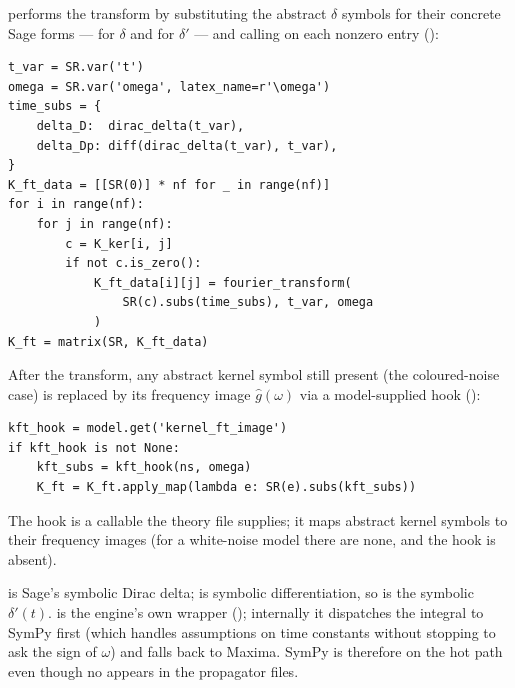  performs the transform by substituting the abstract
$\delta$ symbols for their concrete Sage forms ---  for
$\delta$ and  for $\delta'$ --- and calling
 on each nonzero entry
():

\begin{lstlisting}
t_var = SR.var('t')
omega = SR.var('omega', latex_name=r'\omega')
time_subs = {
    delta_D:  dirac_delta(t_var),
    delta_Dp: diff(dirac_delta(t_var), t_var),
}
K_ft_data = [[SR(0)] * nf for _ in range(nf)]
for i in range(nf):
    for j in range(nf):
        c = K_ker[i, j]
        if not c.is_zero():
            K_ft_data[i][j] = fourier_transform(
                SR(c).subs(time_subs), t_var, omega
            )
K_ft = matrix(SR, K_ft_data)
\end{lstlisting}

After the transform, any abstract kernel symbol still present (the
coloured-noise case) is replaced by its frequency image $\hat g(\omega)$ via a
model-supplied hook ():

\begin{lstlisting}
kft_hook = model.get('kernel_ft_image')
if kft_hook is not None:
    kft_subs = kft_hook(ns, omega)
    K_ft = K_ft.apply_map(lambda e: SR(e).subs(kft_subs))
\end{lstlisting}

The  hook is a callable the theory file supplies; it maps
abstract kernel symbols to their frequency images (for a white-noise model there
are none, and the hook is absent).

\begin{defn}
 is Sage's symbolic Dirac delta;  is
symbolic differentiation, so  is the symbolic
$\delta'(t)$.  is the engine's own wrapper
(); internally it dispatches the integral to
SymPy first (which handles  assumptions on time constants
without stopping to ask the sign of $\omega$) and falls back to Maxima. SymPy is
therefore on the hot path even though no  appears in the
propagator files.
\end{defn}

